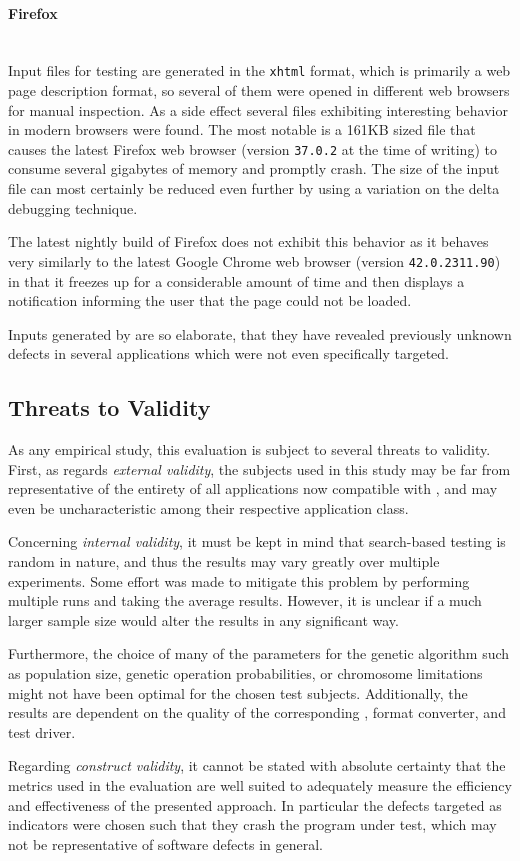 \paragraph{Firefox} ~\\
Input files for testing \libxml are generated in the \texttt{xhtml} format, which is primarily a web page
description format, so several of them were opened in different web browsers for manual inspection. As a side
effect several files exhibiting interesting behavior in modern browsers were found. The most notable is a 161KB
sized file that causes the latest Firefox web browser (version \texttt{37.0.2} at the time of writing) to
consume several gigabytes of memory and promptly crash. The size of the input file can most certainly be
reduced even further by using a variation on the delta debugging technique\cite{zeller2002simplifying}. 

The latest nightly build of Firefox does not exhibit this behavior as it behaves very similarly to the 
latest Google Chrome web browser (version \texttt{42.0.2311.90}) in that it freezes up for a
considerable amount of time and then displays a notification informing the user that the page could not be
loaded.

\begin{mdframed}
Inputs generated by \xmlmate are so elaborate, that they have revealed previously unknown defects in several
applications which were not even specifically targeted.
\end{mdframed}

\subsection{Threats to Validity}
As any empirical study, this evaluation is subject to several threats to validity.
First, as regards \emph{external validity}, the subjects used in this study may be far from representative of
the entirety of all applications now compatible with \xmlmate, and may even be uncharacteristic among their
respective application class.

Concerning \emph{internal validity}, it must be kept in mind that search-based testing is random in nature, and
thus the results may vary greatly over multiple experiments. Some effort was made to mitigate this problem by
performing multiple runs and taking the average results. However, it is unclear if a much larger sample size
would alter the results in any significant way.

Furthermore, the choice of many of the parameters for the genetic algorithm such as population size,
genetic operation probabilities, or chromosome limitations might not have been optimal for the chosen test
subjects. Additionally, the results are dependent on the quality of the corresponding \xsd, format converter,
and test driver.

Regarding \emph{construct validity}, it cannot be stated with absolute certainty that the metrics used in the
evaluation are well suited to adequately measure the efficiency and effectiveness of the presented approach.
In particular the defects targeted as indicators were chosen such that they crash the program under
test, which may not be representative of software defects in general. 
